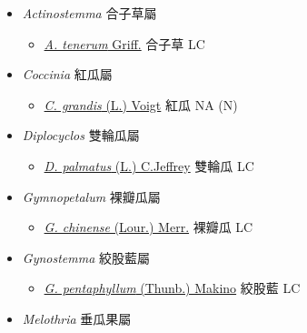 
  \begin{itemize}
 \item[] \textit{Actinostemma} 合子草屬
                                
  \begin{itemize}
        \item[] \href{http://www.theplantlist.org/tpl1.1/search?q=Actinostemma+tenerum}{\textit{A. tenerum} Griff.}   合子草   LC
  \end{itemize}
 \item[] \textit{Coccinia} 紅瓜屬
                                
  \begin{itemize}
        \item[] \href{http://www.theplantlist.org/tpl1.1/search?q=Coccinia+grandis}{\textit{C. grandis} (L.) Voigt}   紅瓜   NA (N)
  \end{itemize}
 \item[] \textit{Diplocyclos} 雙輪瓜屬
                                
  \begin{itemize}
        \item[] \href{http://www.theplantlist.org/tpl1.1/search?q=Diplocyclos+palmatus}{\textit{D. palmatus} (L.) C.Jeffrey}   雙輪瓜   LC
  \end{itemize}
 \item[] \textit{Gymnopetalum} 裸瓣瓜屬
                                
  \begin{itemize}
        \item[] \href{http://www.theplantlist.org/tpl1.1/search?q=Gymnopetalum+chinense}{\textit{G. chinense} (Lour.) Merr.}   裸瓣瓜   LC
  \end{itemize}
 \item[] \textit{Gynostemma} 絞股藍屬
                                
  \begin{itemize}
        \item[] \href{http://www.theplantlist.org/tpl1.1/search?q=Gynostemma+pentaphyllum}{\textit{G. pentaphyllum} (Thunb.) Makino}   絞股藍   LC
  \end{itemize}
 \item[] \textit{Melothria} 垂瓜果屬
                                

\end{itemize}
